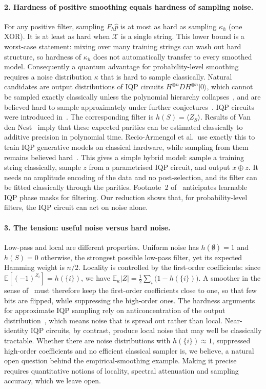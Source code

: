 \documentclass[11pt]{article}
\theoremstyle{definition}
\theoremstyle{remark}
\newcommand{\X}{\mathcal{X}}
\newcommand{\hp}{\hat p}
\begin{document}
\paragraph{2. Hardness of positive smoothing equals hardness of sampling noise.}
For any positive filter, sampling $F_h\hp$ is at most as hard as sampling $\kappa_h$ (one XOR). It is at least as hard when $\X$ is a single string. This lower bound is a worst-case statement: mixing over many training strings can wash out hard structure, so hardness of $\kappa_h$ does not automatically transfer to every smoothed model. Consequently a quantum advantage for probability-level smoothing requires a noise distribution $\kappa$ that is hard to sample classically. Natural candidates are output distributions of IQP circuits $H^{\otimes n}DH^{\otimes n}|0\rangle$, which cannot be sampled exactly classically unless the polynomial hierarchy collapses~\cite{bremner2011iqp}, and are believed hard to sample approximately under further conjectures~\cite{bremner2016average}. IQP circuits were introduced in~\cite{shepherd2009iqp}. The corresponding filter is $h(S)=\langle Z_S\rangle$. Results of Van den Nest~\cite{vandennest2011simulating} imply that these expected parities can be estimated classically to additive precision in polynomial time. Recio-Armengol et al.\ use exactly this to train IQP generative models on classical hardware, while sampling from them remains believed hard~\cite{recio2025train}. This gives a simple hybrid model: sample a training string classically, sample $z$ from a parametrised IQP circuit, and output $x\oplus z$. It needs no amplitude encoding of the data and no post-selection, and its filter can be fitted classically through the parities. Footnote~2 of~\cite{belis2026spectral} anticipates learnable IQP phase masks for filtering. Our reduction shows that, for probability-level filters, the IQP circuit can act on noise alone.

\paragraph{3. The tension: useful noise versus hard noise.}
Low-pass and local are different properties. Uniform noise has $h(\emptyset)=1$ and $h(S)=0$ otherwise, the strongest possible low-pass filter, yet its expected Hamming weight is $n/2$. Locality is controlled by the first-order coefficients: since $\mathbb E[(-1)^{Z_i}]=h(\{i\})$, we have $\mathbb E_\kappa|Z|=\tfrac12\sum_i\bigl(1-h(\{i\})\bigr)$. A smoother in the sense of~\cite{belis2026spectral} must therefore keep the first-order coefficients close to one, so that few bits are flipped, while suppressing the high-order ones. The hardness arguments for approximate IQP sampling rely on anticoncentration of the output distribution~\cite{bremner2016average}, which means noise that is spread out rather than local. Near-identity IQP circuits, by contrast, produce local noise that may well be classically tractable. Whether there are noise distributions with $h(\{i\})\approx1$, suppressed high-order coefficients and no efficient classical sampler is, we believe, a natural open question behind the empirical-smoothing example. Making it precise requires quantitative notions of locality, spectral attenuation and sampling accuracy, which we leave open.
\end{document}
